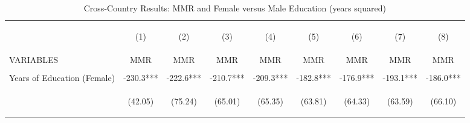 \begin{landscape}\begin{table}[htpb!]\begin{center}\caption{Cross-Country Results: MMR and Female versus Male Education (years squared)}\label{MMRtab:MMRgenderSq}\begin{tabular}{lcccccccc}\toprule&\begin{footnotesize}(1)\end{footnotesize}&\begin{footnotesize}(2)\end{footnotesize}&\begin{footnotesize}(3)\end{footnotesize}&\begin{footnotesize}(4)\end{footnotesize}&\begin{footnotesize}(5)\end{footnotesize}&\begin{footnotesize}(6)\end{footnotesize}&\begin{footnotesize}(7)\end{footnotesize}&\begin{footnotesize}(8) \end{footnotesize}\\
VARIABLES&MMR&MMR&MMR&MMR&MMR&MMR&MMR&MMR\\ \midrule
&&&&&&&&\\
Years of Education (Female) &-230.3***&-222.6***&-210.7***&-209.3***&-182.8***&-176.9***&-193.1***&-186.0***\\
&\begin{footnotesize}(42.05)\end{footnotesize}&\begin{footnotesize}(75.24)\end{footnotesize}&\begin{footnotesize}(65.01)\end{footnotesize}&\begin{footnotesize}(65.35)\end{footnotesize}&\begin{footnotesize}(63.81)\end{footnotesize}&\begin{footnotesize}(64.33)\end{footnotesize}&\begin{footnotesize}(63.59)\end{footnotesize}&\begin{footnotesize}(66.10)\end{footnotesize}\\

\end{tabular}
\end{center}
\end{table}
\end{landscape}
